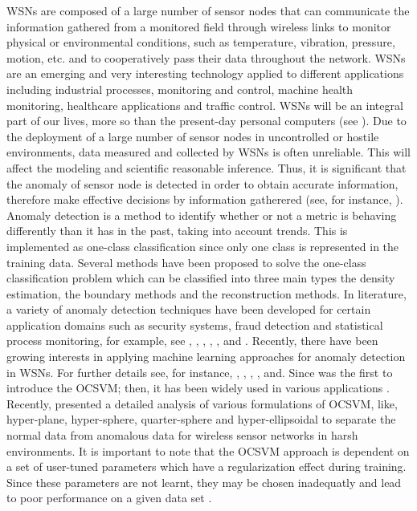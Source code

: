 \documentclass[conference]{IEEEtran}
\begin{document}
WSNs are composed of a large number of sensor nodes that can communicate the information gathered from a monitored field through wireless links to monitor physical or environmental conditions, such as temperature, vibration, pressure, motion, etc. and to cooperatively pass their data throughout the network. WSNs are an emerging and very interesting technology applied to different applications including industrial processes, monitoring and control, machine health monitoring, healthcare applications and traffic control. WSNs will be an integral part of our lives, more so than the present-day personal computers (see \cite{Xie2011}). Due to the deployment of a large number of sensor nodes in uncontrolled or hostile environments, data measured and collected by WSNs is often  unreliable. This will affect the modeling and scientific reasonable inference. Thus, it is significant that the anomaly of sensor node is detected in order to obtain accurate information, therefore make effective decisions by information gatherered (see, for instance, \cite{sharma2010sensor}).\\

Anomaly detection is a method to identify whether or not a metric is behaving differently than it has in the past, taking into account trends. This is implemented as one-class classification since only one class is represented in the training data. Several methods have been proposed to solve the one-class classification problem which can be classified into three main types the density estimation, the boundary methods and the reconstruction methods. In literature, a variety of anomaly detection techniques have been developed for certain application domains such as security systems, fraud detection and statistical process monitoring, for example, see \cite{ilonen2006gaussian}, \cite{clifton2011novelty}, \cite{Tran2015a}, \cite{Tran2015b}, \cite{Chandola2016}, \cite{Tran2016} and \cite{Tran2016c}. Recently, there have been growing interests in applying machine learning approaches for anomaly detection in WSNs. For further details see, for instance, \cite{sharma2010sensor}, \cite{Xie2011}, \cite{Rajasegarar2014}, \cite{Chandola2016}, and\cite{feng2017new}. Since  \cite{scholkopf2001estimating} was the first to introduce the OCSVM; then, it has been widely used in various applications \cite{wang2004anomaly, rabaoui2008using, metzler2014detection}. Recently, \cite{shahid2015one} presented a detailed analysis of various formulations of OCSVM, like, hyper-plane, hyper-sphere, quarter-sphere and hyper-ellipsoidal to separate the normal data from anomalous data for wireless sensor networks in harsh environments. 
It is important to note that the OCSVM approach is dependent on a set of user-tuned parameters which have a regularization 
effect during training.  Since these parameters are not learnt, they may be chosen inadequatly 
and lead to poor performance on a given data set \cite{rabaoui2008using}.\\
\end{document}

